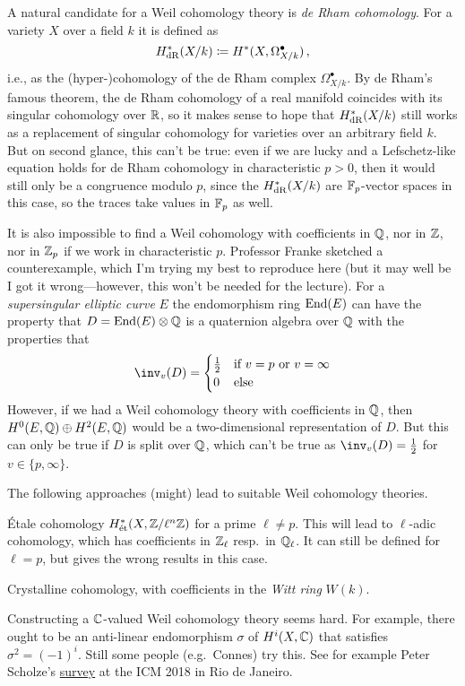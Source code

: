 \begin{cntx}
A natural candidate for a Weil cohomology theory is \emph{de Rham cohomology}. For a variety $X$ over a field $k$ it is defined as 
\begin{equation*}
	H_{\mathrm{dR}}^*(X/k)\coloneqq H^*(X,\Omega_{X/k}^\bullet)\,,
\end{equation*}
i.e., as the (hyper-)cohomology of the de Rham complex $\Omega_{X/k}^\bullet$.	By de Rham's famous theorem, the de Rham cohomology of a real manifold coincides with its singular cohomology over $\mathbb{R}$, so it makes sense to hope that $H_{\mathrm{dR}}^*(X/k)$ still works as a replacement of singular cohomology for varieties over an arbitrary field $k$. But on second glance, this can't be true: even if we are lucky and a Lefschetz-like equation holds for de Rham cohomology in characteristic $p >0$, then it would still only be a congruence modulo $p$, since the $H_{\mathrm{dR}}^*(X/k)$ are $\mathbb{F}_p$-vector spaces in this case, so the traces take values in $\mathbb{F}_p$ as well.
\end{cntx}
\begin{cntx}
It is also impossible to find a Weil cohomology with coefficients in $\mathbb{Q}$, nor in $\mathbb{Z}$, nor in $\mathbb{Z}_p$ if we work in characteristic $p$. Professor Franke sketched a counterexample, which I'm trying my best to reproduce here (but it may well be I got it wrong---however, this won't be needed for the lecture). For a \emph{supersingular elliptic curve} $E$ the endomorphism ring $\operatorname{End}(E)$ can have the property that $D=\operatorname{End}(E)\otimes \mathbb{Q}$ is a quaternion algebra over $\mathbb{Q}$ with the properties that
\begin{align*}
	\inv_v(D)=\begin{cases}
		\frac{1}{2} & \text{if }v=p\text{ or }v=\infty\\
		0 & \text{else}
	\end{cases}
\end{align*}
However, if we had a Weil cohomology theory with coefficients in $\mathbb{Q}$, then $H^0(E,\mathbb{Q})\oplus H^2(E,\mathbb{Q})$ would be a two-dimensional representation of $D$. But this can only be true if $D$ is split over $\mathbb{Q}$, which can't be true as $\inv_v(D)=\frac12$ for $v\in\{p,\infty\}$.
\end{cntx}
 The following approaches (might) lead to suitable Weil cohomology theories.
\begin{alphanumerate}
	\item Étale cohomology $H_{\mathrm{\acute{e}t}}^*(X,\mathbb{Z}/\ell^n\mathbb{Z})$ for a prime $\ell\neq p$. This will lead to $\ell$-adic cohomology, which has coefficients in $\mathbb{Z}_\ell$ resp.\ in $\mathbb{Q}_\ell$. It can still be defined for $\ell=p$, but gives the wrong results in this case.
	\item Crystalline cohomology, with coefficients in the \emph{Witt ring} $W(k)$.
	\item Constructing a $\mathbb{C}$-valued Weil cohomology theory seems hard. For example, there ought to be an anti-linear endomorphism $\sigma$ of $H^i(X,\mathbb{C})$ that satisfies $\sigma^2=(-1)^i$. Still some people (e.g.\ Connes) try this. See for example Peter Scholze's \href{http://www.math.uni-bonn.de/people/scholze/Rio.pdf}{survey} at the ICM 2018 in Rio de Janeiro.
\end{alphanumerate}
